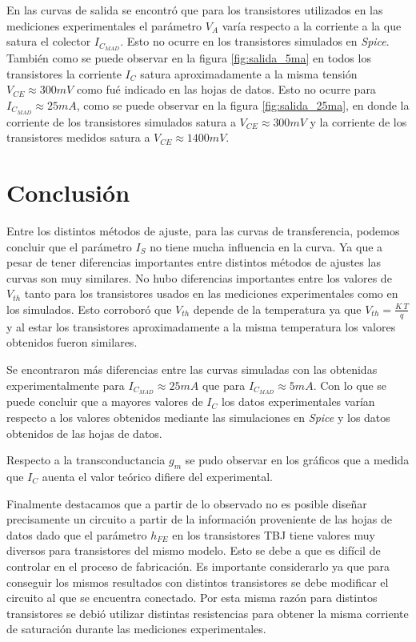 \documentclass[10pt,spanish,a4paper,openany,notitlepage]{article}
\begin{document}
En las curvas de salida se encontró que para los transistores utilizados
en las mediciones experimentales el parámetro $V_A$ varía respecto a la
corriente a la que satura el colector $I_{C_{MAD}}$. Esto no ocurre en
los transistores simulados en \emph{Spice}.\\
También como se puede observar en la figura \ref{fig:salida_5ma} en todos
los transistores la corriente $I_C$ satura aproximadamente a la misma tensión $V_{CE} \approx 300\unit{mV}$
como fué indicado en las hojas de datos.
Esto no ocurre para $I_{C_{MAD}} \approx 25 \unit{mA}$, como se puede observar
en la figura \ref{fig:salida_25ma}, en donde la corriente de los transistores
simulados satura a $V_{CE} \approx 300\unit{mV}$ y la corriente de los transistores
medidos satura a $V_{CE} \approx 1400\unit{mV}$.

\section{Conclusión}

Entre los distintos métodos de ajuste, para las curvas de transferencia,
podemos concluir que el parámetro $I_S$ no tiene mucha influencia en la curva.
Ya que a pesar de tener diferencias importantes entre distintos métodos
de ajustes las curvas son muy similares.
No hubo diferencias importantes entre los valores de $V_{th}$ tanto 
para los transistores usados en las mediciones experimentales como en los 
simulados. Esto corroboró que $V_{th}$ depende de la temperatura ya que
$V_{th} = \frac{K\ T}{q}$ y al estar los transistores aproximadamente
a la misma temperatura los valores obtenidos fueron similares.

Se encontraron más diferencias entre las curvas simuladas con las
obtenidas experimentalmente para $I_{C_{MAD}} \approx 25 \unit{mA}$ que para
$I_{C_{MAD}} \approx 5 \unit{mA}$. Con lo que se puede concluir que
a mayores valores de $I_{C}$ los datos experimentales varían respecto
a los valores obtenidos mediante las simulaciones en \emph{Spice} y los
datos obtenidos de las hojas de datos.

Respecto a la transconductancia $g_m$ se pudo observar en los gráficos
que a medida que $I_C$ auenta el valor teórico difiere del experimental.


Finalmente destacamos que a partir de lo observado no es posible diseñar 
precisamente un circuito a partir de la información proveniente de las hojas de datos
dado que el parámetro $h_{FE}$ en los transistores
TBJ tiene valores muy diversos para transistores del mismo modelo.
Esto se debe a que es difícil de controlar en el proceso de fabricación.
Es importante considerarlo ya que para  conseguir los mismos resultados con 
distintos transistores se debe modificar el circuito al que se encuentra conectado. 
Por esta misma razón para distintos transistores se debió utilizar distintas resistencias para 
obtener la misma corriente de saturación durante las mediciones experimentales.
\end{document}
